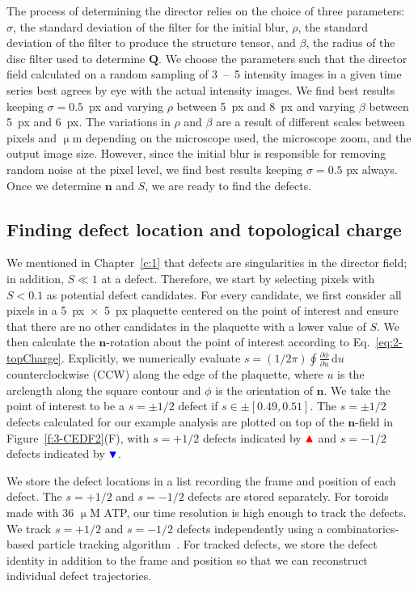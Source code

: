 The process of determining the director relies on the choice of three parameters: $\sigma$, the standard deviation of the filter for the initial blur, $\rho$, the standard deviation of the filter to produce the structure tensor, and $\beta$, the radius of the disc filter used to determine $\mathbf{Q}$.
We choose the parameters such that the director field calculated on a random sampling of 3~--~5 intensity images in a given time series best agrees by eye with the actual intensity images.
We find best results keeping $\sigma = 0.5$~px and varying $\rho$ between 5~px and 8~px and varying $\beta$ between 5~px and 6~px.
The variations in $\rho$ and $\beta$ are a result of different scales between pixels and $\upmu$m depending on the microscope used, the microscope zoom, and the output image size.
However, since the initial blur is responsible for removing random noise at the pixel level, we find best results keeping $\sigma = 0.5$ px always.
Once we determine $\mathbf{n}$ and $S$, we are ready to find the defects.


\subsection{Finding defect location and topological charge}
We mentioned in Chapter~\ref{c:1} that defects are singularities in the director field; in addition, $S \ll 1$ at a defect.
Therefore, we start by selecting pixels with $S < 0.1$ as potential defect candidates.
For every candidate, we first consider all pixels in a 5~px~$\times$~5~px plaquette centered on the point of interest and ensure that there are no other candidates in the plaquette with a lower value of $S$.
We then calculate the $\mathbf{n}$-rotation about the point of interest according to Eq.~\ref{eq:2-topCharge}.
Explicitly, we numerically evaluate $s = (1 / 2 \pi)\oint \frac{\partial\phi}{\partial u} \, \textrm{d}u$ counterclockwise (CCW) along the edge of the plaquette, where $u$ is the arclength along the square contour and $\phi$ is the orientation of $\mathbf{n}$.
We take the point of interest to be a $s = \pm 1/2$ defect if $s \in \pm [0.49,0.51]$.
The $s=\pm1/2$ defects calculated for our example analysis are plotted on top of the $\mathbf{n}$-field in Figure~\ref{f:3-CEDF2}(F), with $s = +1/2$ defects indicated by ${\color{red} \blacktriangle } $  and $s = -1/2$ defects indicated by ${ \color{blue} \blacktriangledown } $.

We store the defect locations in a list recording the frame and position of each defect.
The $s = +1/2$ and $s = -1/2$ defects are stored separately.
For toroids made with 36 $\upmu$M ATP, our time resolution is high enough to track the defects.
We track $s = +1/2$ and $s = -1/2$ defects independently using a combinatorics-based particle tracking algorithm~\cite{RN54,crockerGrierNotes}.
For tracked defects, we store the defect identity in addition to the frame and position so that we can reconstruct individual defect trajectories.


